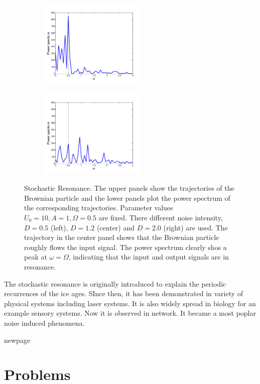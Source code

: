\begin{figure}
\begin{subfigure}{0.32\textwidth}
		\caption{}\label{fig:sr_l_spec}
	\end{subfigure}
	\begin{subfigure}{0.32\textwidth}
		\centering
		\includegraphics[width=2in]{18.Langevin/sr_match_spectrum.pdf}
		\caption{}\label{fig:sr_m_spec}
	\end{subfigure}
	\begin{subfigure}{0.32\textwidth}
		\centering
		\includegraphics[width=2in]{18.Langevin/sr_high_spectrum.pdf}
		\caption{}\label{fig:sr_h_spec}
	\end{subfigure}
\caption{Stochastic Resonance. The upper panels show the trajectories of the Brownian particle and the lower panels plot the power spectrum of the corresponding trajectories.  Parameter values $U_0=10, A=1, \Omega=0.5$ are fixed.  There different noise intensity, $D=0.5$ (left), $D=1.2$ (center) and $D=2.0$ (right) are used.  The trajectory in the center panel shows that the Brownian particle roughly flows the input signal.  The power spectrum clearly shos a peak at $\omega=\Omega$, indicating that the input and output signals are in resonance.}
\label{fig:sr}
\end{figure}

The stochastic resonance is originally introduced to explain the periodic recurrences of the ice ages.\cite{sr_wiesenfeld,sr_bulsara}   SInce then, it has been demonstrated in variety of physical systems including laser systems.  It is also widely spread in biology  for an example sensory systems.  Now it is observed in network.  It became a most poplar noise induced phenomena.

newpage
\noindent
\section{Problems}


